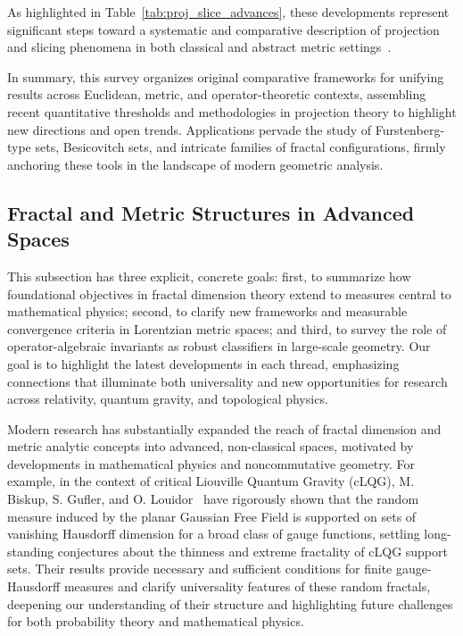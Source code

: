 \documentclass[sigconf]{acmart}
\begin{document}
As highlighted in Table~\ref{tab:proj_slice_advances}, these developments represent significant steps toward a systematic and comparative description of projection and slicing phenomena in both classical and abstract metric settings~\cite{ref74, ref43, ref75, ref1, ref6, ref23, ref30, ref92}.

In summary, this survey organizes original comparative frameworks for unifying results across Euclidean, metric, and operator-theoretic contexts, assembling recent quantitative thresholds and methodologies in projection theory to highlight new directions and open trends. Applications pervade the study of Furstenberg-type sets, Besicovitch sets, and intricate families of fractal configurations, firmly anchoring these tools in the landscape of modern geometric analysis.

\subsection{Fractal and Metric Structures in Advanced Spaces}

This subsection has three explicit, concrete goals: first, to summarize how foundational objectives in fractal dimension theory extend to measures central to mathematical physics; second, to clarify new frameworks and measurable convergence criteria in Lorentzian metric spaces; and third, to survey the role of operator-algebraic invariants as robust classifiers in large-scale geometry. Our goal is to highlight the latest developments in each thread, emphasizing connections that illuminate both universality and new opportunities for research across relativity, quantum gravity, and topological physics.

Modern research has substantially expanded the reach of fractal dimension and metric analytic concepts into advanced, non-classical spaces, motivated by developments in mathematical physics and noncommutative geometry. For example, in the context of critical Liouville Quantum Gravity (cLQG), M. Biskup, S. Gufler, and O. Louidor~\cite{ref81} have rigorously shown that the random measure induced by the planar Gaussian Free Field is supported on sets of vanishing Hausdorff dimension for a broad class of gauge functions, settling long-standing conjectures about the thinness and extreme fractality of cLQG support sets. Their results provide necessary and sufficient conditions for finite gauge-Hausdorff measures and clarify universality features of these random fractals, deepening our understanding of their structure and highlighting future challenges for both probability theory and mathematical physics.
\end{document}
